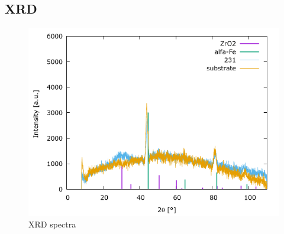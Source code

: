 
\subsection{XRD}
\begin{figure}
	\centering
	\includegraphics[width=\picwidth]{Pics/xrd.png}
	\caption{XRD spectra}
	\label{fig:xrd}
\end{figure}

